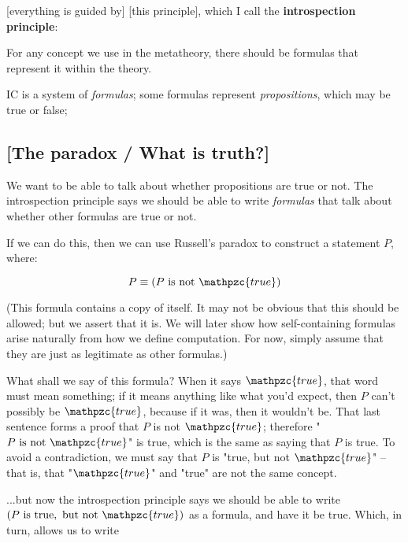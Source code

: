 \documentclass{article}
\begin{document}
  [everything is guided by] [this principle], which I call the \textbf{introspection principle}:
  
  
  \begin{center}
    For any concept we use in the metatheory, there should be formulas that represent it within the theory.
  \end{center}
 
  IC is a system of \emph{formulas}; some formulas represent \emph{propositions}, which may be true or false;

  
  \subsection{[The paradox / What is truth?]}
  
  We want to be able to talk about whether propositions are true or not. The introspection principle says we should be able to write \emph{formulas} that talk about whether other formulas are true or not.
  
  If we can do this, then we can use Russell's paradox to construct a statement $P$, where:
  
  \begin{equation*}
    P \equiv (P \mathrm{\ is\ not\ }\mathpzc{true})\\
  \end{equation*}
  
  (This formula contains a copy of itself.
  It may not be obvious that this should be allowed; but we assert that it is.
  We will later show how self-containing formulas arise naturally from how we define computation.
  For now, simply assume that they are just as legitimate as other formulas.)
  
  What shall we say of this formula?
  When it says $\mathpzc{true}$, that word must mean something; if it means anything like what you'd expect, then $P$ can't possibly be $\mathpzc{true}$, because if it was, then it wouldn't be.
  That last sentence forms a proof that $P$ is not $\mathpzc{true}$; therefore "$P \mathrm{\ is\ not\ }\mathpzc{true}$" is true, which is the same as saying that $P$ is true.
  To avoid a contradiction, we must say that $P$ is "true, but not $\mathpzc{true}$" – that is, that "$\mathpzc{true}$" and "true" are not the same concept.
  
  ...but now the introspection principle says we should be able to write $(P \mathrm{\ is\ true,\ but\ not\ }\mathpzc{true})$ as a formula, and have it be true.
  Which, in turn, allows us to write
  
\end{document}
